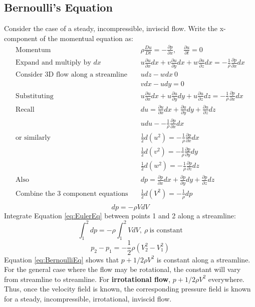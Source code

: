 \documentclass[draft=false, titlepage]{article}
\newcommand{\partialfrac}[2]{\frac{\partial #1}{\partial #2}}
\begin{document}
\subsection{Bernoulli's Equation}
Consider the case of a steady, incompressible, inviscid flow. Write the x-component of the momentual equation as:
\begin{align*}
    \text{Momentum} \quad & \rho \frac{Du}{Dt} = -\partialfrac{p}{x},\quad \partialfrac{u}{t} = 0\\
    \text{Expand and multiply by } dx \quad &
    u\partialfrac{u}{x} dx + v\partialfrac{u}{y}dx + w\partialfrac{u}{z}dx = -\frac{1}{\rho}\partialfrac{p}{x}dx\\
    \text{Consider 3D flow along a streamline} \quad & u dz - wdx \ 0\\
    & v dx - u dy = 0\\
    \text{Substituting} \quad &
    u\partialfrac{u}{x}dx + u\partialfrac{u}{y}dy + u\partialfrac{u}{z}dz = -\frac{1}{\rho}\partialfrac{p}{x}dx \\
    \text{Recall} \quad & du = \partialfrac{u}{x} dx + \partialfrac{u}{y}dy + \partialfrac{u}{z}dz \\
    & u du - -\frac{1}{\rho} \partialfrac{p}{x}dx \\
    \text{or similarly} \quad & \frac{1}{2}d(u^2) = -\frac{1}{\rho} \partialfrac{p}{x}dx \\
    & \frac{1}{2}d(v^2) = -\frac{1}{\rho} \partialfrac{p}{y}dy \\
    & \frac{1}{2}d(w^2) = -\frac{1}{\rho} \partialfrac{p}{z}dz \\
    \text{Also} \quad & dp = \partialfrac{p}{x}dx + \partialfrac{p}{y}dy + \partialfrac{p}{z}dz \\
    \text{Combine the 3 component equations} \quad & \frac{1}{2}d(V^2) = -\frac{1}{\rho}dp\\
\end{align*}
\begin{equation}
    dp = -\rho VdV
    \label{eq:EulerEq}
\end{equation}
Integrate Equation \ref{eq:EulerEq} between points 1 and 2 along a streamline:
\begin{equation*}
    \int_1^2 dp = -\rho \int_1^2 VdV,\ \rho\ \text{is constant}
\end{equation*}
\begin{equation}
    p_2 - p_1 = -\frac{1}{2}\rho (V_2^2 - V_1^2)
    \label{eq:BernoulliEq}
\end{equation}
Equation \ref{eq:BernoulliEq} shows that $p + 1/2\rho V^2$ is constant along a streamline. For the general case where the flow may be rotational, the constant will vary from streamline to streamline. For \textbf{irrotational flow}, $p + 1/2 \rho V^2$ everywhere. Thus, once the velocity field is known, the corresponding pressure field is known for a steady, incompressible, irrotational, inviscid flow.
\end{document}
